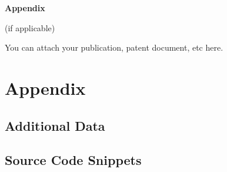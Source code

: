 \centerline{\xiaoyi\bf Appendix}
\centerline{\fontsize{11pt}{13.2pt}\selectfont(if applicable)}

\centerline{You can attach your publication, patent document, etc here.}

\chapter*{Appendix}

\section{Additional Data}

\section{Source Code Snippets}
